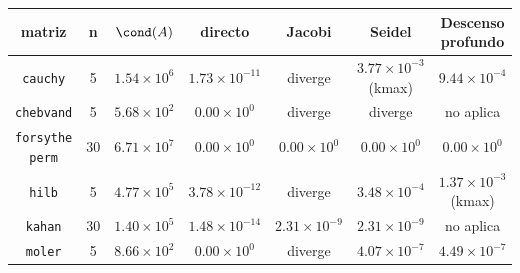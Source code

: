 {\scriptsize
\begin{tabular}{ccccccc}
\toprule
\rowcolor{Azul1!50}
matriz & n & $\cond(A)$ & directo & Jacobi & Seidel & Descenso profundo \\
\midrule
\texttt{cauchy} & 5 & $1.54\times10^{6}$ & $1.73\times10^{-11}$ & diverge & $3.77\times10^{-3}$ (kmax) & $9.44\times10^{-4}$ \\
\texttt{chebvand} & 5 & $5.68\times10^{2}$ & $0.00\times10^{0}$ & diverge & diverge & no aplica \\
\texttt{forsythe perm} & 30 & $6.71\times10^{7}$ & $0.00\times10^{0}$ & $0.00\times10^{0}$ & $0.00\times10^{0}$ & $0.00\times10^{0}$ \\
\texttt{hilb} & 5 & $4.77\times10^{5}$ & $3.78\times10^{-12}$ & diverge & $3.48\times10^{-4}$ & $1.37\times10^{-3}$ (kmax) \\
\texttt{kahan} & 30 & $1.40\times10^{5}$ & $1.48\times10^{-14}$ & $2.31\times10^{-9}$ & $2.31\times10^{-9}$ & no aplica \\
\texttt{moler} & 5 & $8.66\times10^{2}$ & $0.00\times10^{0}$ & diverge & $4.07\times10^{-7}$ & $4.49\times10^{-7}$ \\
\bottomrule
\end{tabular}}
